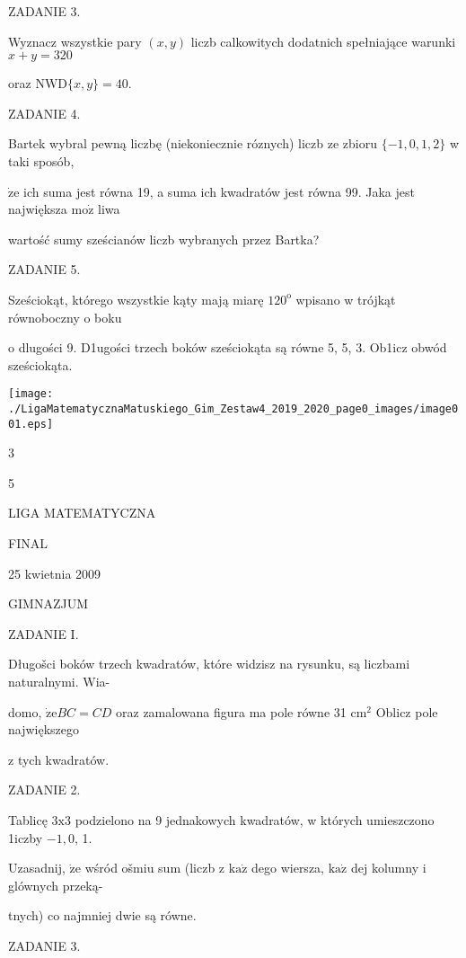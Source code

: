 \documentclass[a4paper,12pt]{article}
\begin{document}
ZADANIE 3.

Wyznacz wszystkie pary $(x,y)$ liczb calkowitych dodatnich spełniające warunki $x+y=320$

oraz $\mathrm{N}\mathrm{W}\mathrm{D}\{x,y\}=40.$

ZADANIE 4.

Bartek wybral pewną liczbę (niekoniecznie róznych) liczb ze zbioru $\{-1,0,1,2\}$ w taki sposób,

$\dot{\mathrm{z}}\mathrm{e}$ ich suma jest równa 19, a suma ich kwadratów jest równa 99. Jaka jest największa $\mathrm{m}\mathrm{o}\dot{\mathrm{z}}$ liwa

wartość sumy sześcianów liczb wybranych przez Bartka?

ZADANIE 5.

Sześciokąt, którego wszystkie kąty mają miarę $120^{\mathrm{o}}$ wpisano w trójkąt równoboczny o boku

o dlugości 9. D1ugości trzech boków sześciokąta są równe 5, 5, 3. Ob1icz obwód sześciokąta.
\begin{center}
\texttt{[image: ./LigaMatematycznaMatuskiego\_Gim\_Zestaw4\_2019\_2020\_page0\_images/image001.eps]}
\end{center}
3

5






LIGA MATEMATYCZNA

FINAL

25 kwietnia 2009

GIMNAZJUM

ZADANIE I.

Długošci boków trzech kwadratów, które widzisz na rysunku, są liczbami naturalnymi. Wia-

domo, $\dot{\mathrm{z}}\mathrm{e}BC=CD$ oraz zamalowana figura ma pole równe 31 $\mathrm{c}\mathrm{m}^{2}$ Oblicz pole największego

z tych kwadratów.

ZADANIE 2.

Tablicę $3\mathrm{x}3$ podzielono na 9 jednakowych kwadratów, w których umieszczono 1iczby $-1, 0$, 1.

Uzasadnij, $\dot{\mathrm{z}}\mathrm{e}$ wśród ošmiu sum (liczb z $\mathrm{k}\mathrm{a}\dot{\mathrm{z}}$ dego wiersza, $\mathrm{k}\mathrm{a}\dot{\mathrm{z}}$ dej kolumny i glównych przeką-

tnych) co najmniej dwie są równe.

ZADANIE 3.
\end{document}
